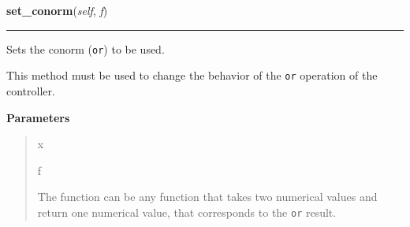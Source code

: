     \begin{boxedminipage}{\textwidth}

    \raggedright \textbf{set\_conorm}(\textit{self}, \textit{f})

    \vspace{-1.5ex}

    \rule{\textwidth}{0.5\fboxrule}

Sets the conorm (\texttt{or}) to be used.

This method must be used to change the behavior of the \texttt{or} operation
of the controller.
    \vspace{1ex}

      \textbf{Parameters}
      \begin{quote}
        \begin{Ventry}{x}

          \item[f]


The function can be any function that takes two numerical values and
return one numerical value, that corresponds to the \texttt{or} result.
        \end{Ventry}

      \end{quote}

    \vspace{1ex}

    \end{boxedminipage}

    \label{peach:fuzzy:control:Controller:set_implication}

    \vspace{0.5ex}

